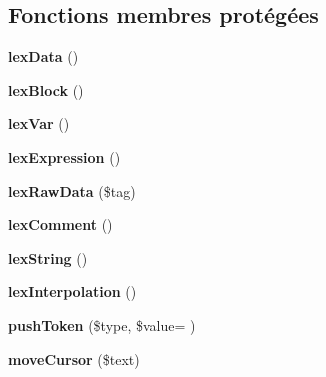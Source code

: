 \subsection*{Fonctions membres protégées}
\begin{DoxyCompactItemize}
\item 
{\bfseries lex\+Data} ()\hypertarget{class_twig___lexer_a2add928259bb030ac402cc33590ba64a}{}\label{class_twig___lexer_a2add928259bb030ac402cc33590ba64a}

\item 
{\bfseries lex\+Block} ()\hypertarget{class_twig___lexer_a30dd86720deb6f2a0e87dbfc48937c57}{}\label{class_twig___lexer_a30dd86720deb6f2a0e87dbfc48937c57}

\item 
{\bfseries lex\+Var} ()\hypertarget{class_twig___lexer_a848a6f31f1b60791ecb8c3193c64c6e0}{}\label{class_twig___lexer_a848a6f31f1b60791ecb8c3193c64c6e0}

\item 
{\bfseries lex\+Expression} ()\hypertarget{class_twig___lexer_ac956b3fcfa0824c6a4e45e807c650a9e}{}\label{class_twig___lexer_ac956b3fcfa0824c6a4e45e807c650a9e}

\item 
{\bfseries lex\+Raw\+Data} (\$tag)\hypertarget{class_twig___lexer_a311224b615ef6c8b3b134a63e7e9d1c3}{}\label{class_twig___lexer_a311224b615ef6c8b3b134a63e7e9d1c3}

\item 
{\bfseries lex\+Comment} ()\hypertarget{class_twig___lexer_a83490c3c77d548d2bc407e7a765a6294}{}\label{class_twig___lexer_a83490c3c77d548d2bc407e7a765a6294}

\item 
{\bfseries lex\+String} ()\hypertarget{class_twig___lexer_a3ed3bf6449b50d0c0e3695ba465477c3}{}\label{class_twig___lexer_a3ed3bf6449b50d0c0e3695ba465477c3}

\item 
{\bfseries lex\+Interpolation} ()\hypertarget{class_twig___lexer_a17e2f99891071f122a720e5067bfd883}{}\label{class_twig___lexer_a17e2f99891071f122a720e5067bfd883}

\item 
{\bfseries push\+Token} (\$type, \$value= \textquotesingle{}\textquotesingle{})\hypertarget{class_twig___lexer_a2a4e2b0b3f1bf74213d5536b6668106d}{}\label{class_twig___lexer_a2a4e2b0b3f1bf74213d5536b6668106d}

\item 
{\bfseries move\+Cursor} (\$text)\hypertarget{class_twig___lexer_a5dbd7870991505f65e5cc292a4b30272}{}\label{class_twig___lexer_a5dbd7870991505f65e5cc292a4b30272}


\end{DoxyCompactItemize}
